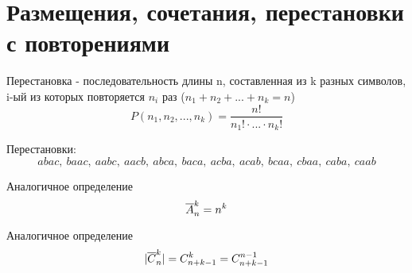 \documentclass[discrete.tex]{subfiles}
\begin{document}
  \section{Размещения, сочетания, перестановки с повторениями}
  
  \begin{definition}
    Перестановка - последовательность длины n, составленная из k разных символов, i-ый из которых повторяется $n_i$ раз ($n_1 + n_2 + ... + n_k = n$)
    \[P(n_1,n_2,...,n_k) = \frac{n!}{n_1! \cdot ... \cdot n_k!}\]
  \end{definition}

  \begin{example}
    Перестановки:
    \[abac,\ baac,\ aabc,\ aacb,\ abca,\ baca,\ acba,\ acab,\ bcaa,\ cbaa,\ caba,\ caab\]
  \end{example}

  \begin{definition}
    Аналогичное определение
    \[\overline{A}_n^k = n^k\]
  \end{definition}

  \begin{definition}
    Аналогичное определение
    \[|\overline{C}_n^k| = C^k_{n+k-1} = C^{n-1}_{n+k-1}\]
  \end{definition}
\end{document}
